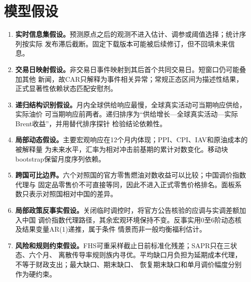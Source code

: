 \section{模型假设}

\begin{enumerate}
  \item \textbf{实时信息集假设。}预测原点之后的观测不进入估计、调参或阈值选择；统计序列按实际
  发布滞后截断。固定下载版本可能被后续修订，但不回填未来信息。
  \item \textbf{交易日映射假设。}非交易日事件映射到其后首个共同交易日。短窗口仍可能叠加其他
  新闻，故CAR只解释为事件相关异常；常规正态区间为描述性结果，正式显著性依赖状态匹配安慰剂。
  \item \textbf{递归结构识别假设。}月内全球供给响应最慢，全球真实活动可当期响应供给，实际油价
  可当期响应前两者。递归排序为“供给增长---全球真实活动---实际Brent收益”，并用替代排序探针
  检验结论依赖性。
  \item \textbf{局部动态假设。}主要宏观响应在12个月内体现；PPI、CPI、IAV和原油成本的被解释量
  为未来水平，汇率为相对冲击前基期的累计对数变化。移动块bootstrap保留月度序列依赖。
  \item \textbf{跨国可比边界。}六个对照国的官方零售燃油对数收益可以比较；中国调价指数代理与
  固定品零售价不可直接等同，因此不进入正式零售价格排名。面板系数只表示对照国相对中国的差异。
  \item \textbf{局部政策反事实假设。}关闭临时调控时，将官方公告核验的应调与实调差额加入中国
  调价指数代理路径，其余宏观环境保持不变。反事实用0至6阶动态核及结果变量AR(1)递推，属于条件
  情景而非一般均衡福利估计。
  \item \textbf{风险和规则约束假设。}FHS可重采样截止日前标准化残差；SAPR只在三状态、六个月、
  离散传导率规则族内寻优。平均缺口月负担为延期成本代理，不等于财政支出；最大缺口、期末缺口、
  恢复期末缺口和单月调价幅度分别作为硬约束。
\end{enumerate}
